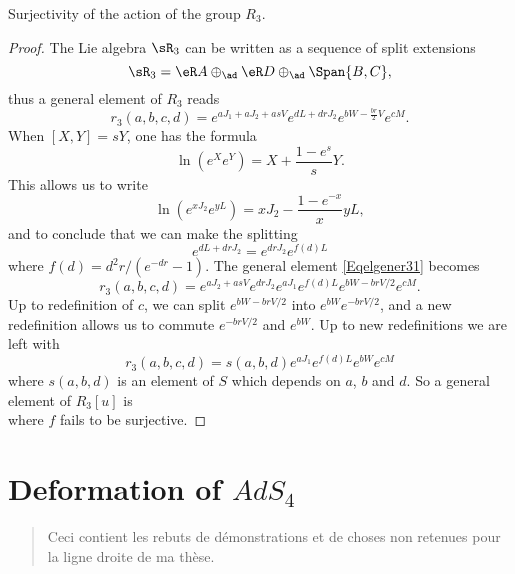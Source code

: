 \begin{proposition}
	Surjectivity of the action of the group $R_3$.
\end{proposition}

\begin{proof}
The Lie algebra $\sR_3$ can be written as a sequence of split extensions
\[
	\sR_3=\eR A\oplus_{\ad}\eR D\oplus_{\ad}\Span\{ B,C \},
\]
thus a general element of $R_3$ reads
\begin{equation}  \label{Eqelgener31}
r_3(a,b,c,d)= e^{aJ_1+aJ_2+asV} e^{dL+drJ_2} e^{bW-\frac{ br }{2}V} e^{cM}.
\end {equation}
When $[X,Y]=sY$, one has the formula
\begin{equation}
	\ln(e^{X} e^{Y})=X+\frac{ 1- e^{s} }{ s }Y.
\end{equation}
This allows us to write
\[
	\ln( e^{xJ_2} e^{yL})= xJ_2-\frac{ 1- e^{-x} }{ x }yL,
\]
and to conclude that we can make the splitting
\[
	e^{dL+drJ_2}= e^{drJ_2} e^{f(d)L}
\]
where $f(d)=d^{2}r/( e^{-dr}-1)$. The general element \eqref{Eqelgener31} becomes
\[
	r_3(a,b,c,d)= e^{aJ_2+asV} e^{drJ_2} e^{aJ_1} e^{f(d)L} e^{bW-brV/2} e^{cM}.
\]
Up to redefinition of $c$, we can split $ e^{bW-brV/2}$ into $ e^{bW} e^{-brV/2}$, and a new redefinition allows us to commute $ e^{-brV/2}$ and $ e^{bW}$. Up to new redefinitions we are left with
\[
	r_3(a,b,c,d)=s(a,b,d) e^{aJ_1} e^{f(d)L} e^{bW} e^{cM}
\]
where $s(a,b,d)$ is an element of $S$ which depends on $a$, $b$ and $d$. So a general element of $R_3[u]$ is
\begin{equation}
	[ e^{cM} e^{bW} e^{-f(d)L} e^{aJ_1}u]
\end{equation}
where $f$ fails to be surjective.
\end{proof}

%
\section{Deformation of \texorpdfstring{$AdS_4$}{AdS4}}
%


\begin{abstract}
	Ceci contient les rebuts de démonstrations et de choses non retenues pour la ligne droite de ma thèse.
\end{abstract}

